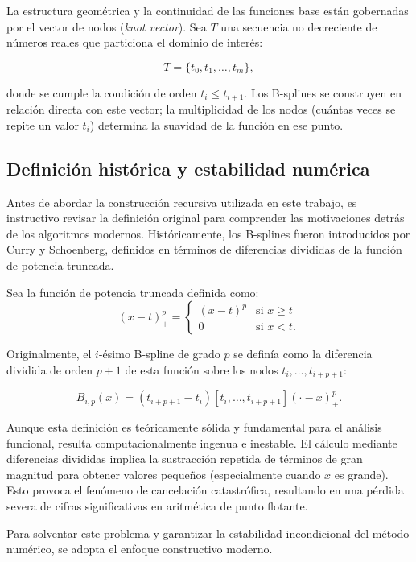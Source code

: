 \documentclass[12pt, a4paper, oneside, spanish]{book}
\begin{document}
La estructura geométrica y la continuidad de las funciones base están gobernadas por el vector de nodos (\textit{knot vector}). Sea \( T \) una secuencia no decreciente de números reales que particiona el dominio de interés:

\begin{equation}
\label{eq:knot-vector}
  T = \{ t_0, t_1, \dots, t_m \},
\end{equation}

donde se cumple la condición de orden \( t_i \leq t_{i+1} \). Los B-splines se construyen en relación directa con este vector; la multiplicidad de los nodos (cuántas veces se repite un valor \( t_i \)) determina la suavidad de la función en ese punto.

\subsection{Definición histórica y estabilidad numérica}

Antes de abordar la construcción recursiva utilizada en este trabajo, es instructivo revisar la definición original para comprender las motivaciones detrás de los algoritmos modernos. Históricamente, los B-splines fueron introducidos por Curry y Schoenberg, definidos en términos de diferencias divididas de la función de potencia truncada.

Sea la función de potencia truncada definida como:
\[ (x-t)^p_+ = \begin{cases}(x-t)^p & \text{si } x \geq t \\ 0 & \text{si } x < t. \end{cases} \]

Originalmente, el \( i \)-ésimo B-spline de grado \( p \) se definía como la diferencia dividida de orden \( p+1 \) de esta función sobre los nodos \( t_i, \dots, t_{i+p+1} \):

\[ B_{i,p}(x) = (t_{i+p+1} - t_i)[t_i, \dots, t_{i+p+1}](\cdot - x)^p_+. \]

Aunque esta definición es teóricamente sólida y fundamental para el análisis funcional, resulta computacionalmente ingenua e inestable. El cálculo mediante diferencias divididas implica la sustracción repetida de términos de gran magnitud para obtener valores pequeños (especialmente cuando \( x \) es grande). Esto provoca el fenómeno de cancelación catastrófica, resultando en una pérdida severa de cifras significativas en aritmética de punto flotante.

Para solventar este problema y garantizar la estabilidad incondicional del método numérico, se adopta el enfoque constructivo moderno.
\end{document}
